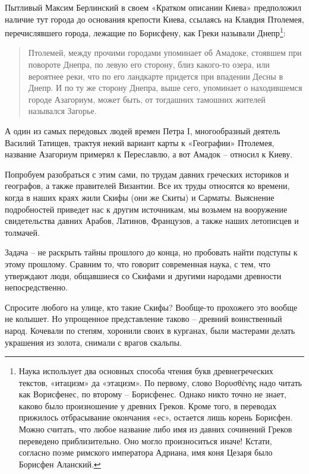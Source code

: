 Пытливый Максим Берлинский в своем «Кратком описании Киева»\cite{berl01} предположил наличие тут города до основания крепости Киева, ссылаясь на Клавдия Птолемея, перечислявшего города, лежащие по Борисфену, как Греки называли Днепр\footnote{Наука использует два основных способа чтения букв древнегреческих текстов, «итацизм» да «этацизм». По первому, слово Βορυσθένης надо читать как Ворисфенес, по второму – Борисфенес. Однако никто точно не знает, каково было произношение у древних Греков. Кроме того, в переводах прижилось отбрасывание окончания «ес», остается лишь корень Борисфен. Можно считать, что любое название либо имя из давних сочинений Греков переведено приблизительно. Оно могло произноситься иначе! Кстати, согласно поэме римского императора Адриана, имя коня Цезаря было Борисфен Аланский.}:

\begin{quotation}
Птолемей, между прочими городами упоминает об Амадоке, стоявшем при повороте Днепра, по левую его сторону, близ какого-то озера, или вероятнее реки, что по его ландкарте придется при впадении Десны в Днепр. И по ту же сторону Днепра, выше сего, упоминает о находившемся городе Азагориум, может быть, от тогдашних тамошних жителей назывался Загорье.
\end{quotation}

А один из самых передовых людей времен Петра I, многообразный деятель Василий Татищев, трактуя некий вариант карты к «Географии» Птолемея, название Азагориум примерял к Переславлю, а вот Амадок – относил к Киеву.

Попробуем разобраться с этим сами, по трудам давних греческих историков и географов, а также правителей Византии. Все их труды относятся ко времени, когда в наших краях жили Скифы (они же Скиты) и Сарматы. Выяснение подробностей приведет нас к другим источникам, мы возьмем на вооружение свидетельства давних Арабов, Латинов, Французов, а также наших летописцев и толмачей.

Задача – не раскрыть тайны прошлого до конца, но пробовать найти подступы к этому прошлому. Сравним то, что говорит современная наука, с тем, что утверждают люди, общавшиеся со Скифами и другими народами древности непосредственно.

Спросите любого на улице, кто такие Скифы? Вообще-то прохожего это вообще не колышет. Но упрощенное представление таково – древний воинственный народ. Кочевали по степям, хоронили своих в курганах, были мастерами делать украшения из золота, снимали с врагов скальпы.

